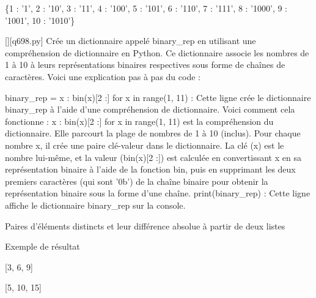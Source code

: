 \{1 : '1', 2 : '10', 3 : '11', 4 : '100', 5 : '101', 6 : '110', 7 : '111', 8 : '1000', 9 : '1001', 10 : '1010'\}
        \par
        \begin{solution}
            \renewcommand{\nomfichier}{q698.py}
            \pythonfile{\chemincode \nomfichier}[][\nomfichier]
            Crée un dictionnaire appelé binary_rep en utilisant une compréhension de dictionnaire en Python. Ce dictionnaire associe les nombres de 1 à 10 à leurs représentations binaires respectives sous forme de chaînes de caractères. Voici une explication pas à pas du code :

    binary_rep = {x : bin(x)[2 :] for x in range(1, 11)} : Cette ligne crée le dictionnaire binary_rep à l'aide d'une compréhension de dictionnaire. Voici comment cela fonctionne :
        {x : bin(x)[2 :] for x in range(1, 11)} est la compréhension du dictionnaire. Elle parcourt la plage de nombres de 1 à 10 (inclus).
        Pour chaque nombre x, il crée une paire clé-valeur dans le dictionnaire. La clé (x) est le nombre lui-même, et la valeur (bin(x)[2 :]) est calculée en convertissant x en sa représentation binaire à l'aide de la fonction bin, puis en supprimant les deux premiers caractères (qui sont '0b') de la chaîne binaire pour obtenir la représentation binaire sous la forme d'une chaîne.
    print(binary_rep) : Cette ligne affiche le dictionnaire binary_rep sur la console.
        \end{solution}
        

        \question
        Paires d'éléments distincts et leur différence absolue à partir de deux listes

Exemple de résultat

[3, 6, 9]

[5, 10, 15]

